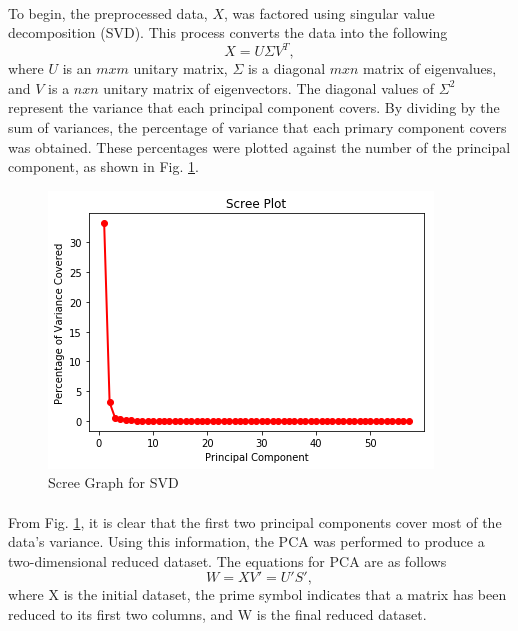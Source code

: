 \documentclass[12pt]{article}
\begin{document}
	\paragraph{}
	To begin, the preprocessed data, $X$, was factored using singular value decomposition (SVD). This process converts the data into the following
	\begin{equation}
		X = U \Sigma V^T,
	\end{equation}
	where $U$ is an $m x m$ unitary matrix, $\Sigma$ is a diagonal $m x n$ matrix of eigenvalues, and $V$ is a $n x n$ unitary matrix of eigenvectors. The diagonal values of $\Sigma^2$ represent the variance that each principal component covers. By dividing by the sum of variances, the percentage of variance that each primary component covers was obtained. These percentages were plotted against the number of the principal component, as shown in Fig. \ref{Scree}.
	\begin{figure}
		\includegraphics[width=\linewidth]{Pictures/scree.png}
		\caption{Scree Graph for SVD}
		\label{Scree}
	\end{figure}
    \paragraph{}
    From Fig. \ref{Scree}, it is clear that the first two principal components cover most of the data's variance. Using this information, the PCA was performed to produce a two-dimensional reduced dataset. The equations for PCA are as follows
    \begin{equation}
    	W = XV\prime = U\prime S\prime,
    \end{equation}
    where X is the initial dataset, the prime symbol indicates that a matrix has been reduced to its first two columns, and W is the final reduced dataset.
\end{document}
